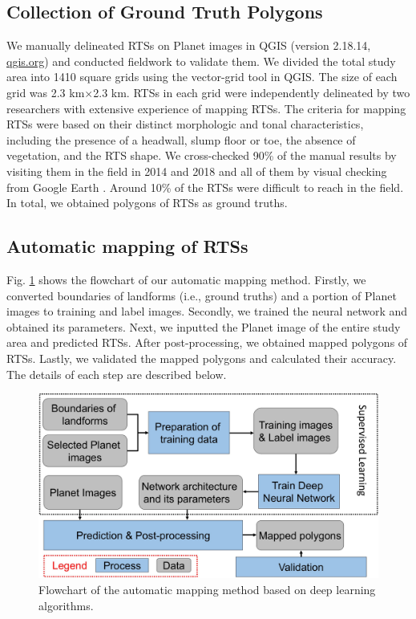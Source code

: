 \documentclass[authoryear,preprint,review,12pt]{elsarticle}
\begin{document}
\subsection{Collection of Ground Truth Polygons}
\label{subsec_collect_groundtruth}

We manually delineated RTSs  on Planet images in QGIS (version 2.18.14, \url{qgis.org}) and conducted fieldwork to validate them. We divided the total study area into 1410 square grids using the vector-grid tool in QGIS. The size of each grid was 2.3 km$\times$2.3 km. RTSs in each grid were independently delineated by two researchers with extensive experience of mapping RTSs. 
The criteria for mapping RTSs were based on their distinct morphologic and tonal characteristics, including the presence of a headwall, slump floor or toe, the absence of vegetation, and the RTS shape. We cross-checked 90\% of the manual results by visiting them in the field in 2014 and 2018 and all of them by visual checking  from Google Earth . Around 10\% of the RTSs were difficult to reach in the field. In total, we obtained  polygons of RTSs as ground truths.  

\subsection{Automatic mapping of RTSs}
\label{subsec_auto_mapping}

Fig. \ref{fig_flowchart} shows the flowchart of our automatic mapping method. Firstly, we converted boundaries of landforms (i.e., ground truths) and a portion of Planet images to training and label images. Secondly, we trained the neural network and obtained its parameters. Next, we inputted the Planet image of the entire study area and predicted RTSs. After post-processing, we obtained mapped polygons of RTSs. Lastly, we validated the mapped polygons and calculated their accuracy. The details of each step are described below.

\begin{figure}[ht]
	\centering
	\includegraphics[width=12cm]{figures/flowchart_trim.jpg}
	\caption{Flowchart of the automatic mapping method based on deep learning algorithms.}
	\label{fig_flowchart}
\end{figure}
\end{document}
